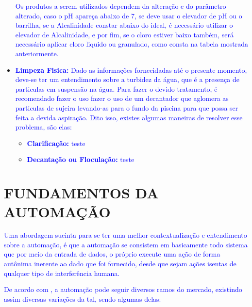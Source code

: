 \begin{itemize}
            \textcolor{blue}{Os produtos a serem utilizados dependem da alteração e do parâmetro alterado, caso o pH apareça abaixo de 7, se deve usar o elevador de pH ou o barrilha, se a Alcalinidade constar abaixo do ideal, é necessário utilizar o elevador de Alcalinidade, e por fim, se o cloro estiver baixo também, será necessário aplicar cloro liquido ou granulado, como consta na tabela mostrada anteriormente.}


            \item \textbf{\textcolor{blue}{Limpeza Fisica:}} \textcolor{blue}{Dado as informações fornecidadas até o presente momento, deve-se ter um entendimento sobre a turbidez da água, que é a presença de particulas em suspensão na água. Para fazer o devido tratamento, é recomendado fazer o uso fazer o uso de um decantador que aglomera as particulas de sujeira levando-as para o fundo da piscina para que possa ser feita a devida aspiração. Dito isso, existes algumas maneiras de resolver esse problema, são elas:}
                \begin{itemize}
                    \item \textbf{\textcolor{blue}{Clarificação:}} \textcolor{blue}{teste}
                    \item \textbf{\textcolor{blue}{Decantação ou Floculação:}} \textcolor{blue}{teste}
                \end{itemize}

            
                        
        \end{itemize}
         
   
\section{FUNDAMENTOS DA AUTOMAÇÃO}
    \textcolor{blue}{Uma abordagem sucinta para se ter uma melhor contextualização e entendimento sobre a automação, é que a automação se consistem em basicamente todo sistema que por meio da entrada de dados, o próprio execute uma ação de forma autônima inerente ao dado que foi fornecido, desde que sejam ações isentas de qualquer tipo de interferência humana.}

    \textcolor{blue}{De acordo com \cite{guiaAutomacao}, a automação pode seguir diversos ramos do mercado, existindo assim diversas variações da tal, sendo algumas delas: }

